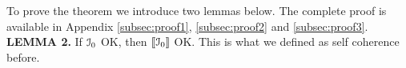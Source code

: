 


To prove the theorem we introduce two lemmas below. The complete proof is available in Appendix \ref{subsec:proof1}, \ref{subsec:proof2} and \ref{subsec:proof3}.\\

\noindent\textbf{LEMMA 2. }
If ${\cal{I}}_0$ OK, then $[\![{\cal{I}}_0]\!]$ OK.
This is what we defined as self coherence before.











